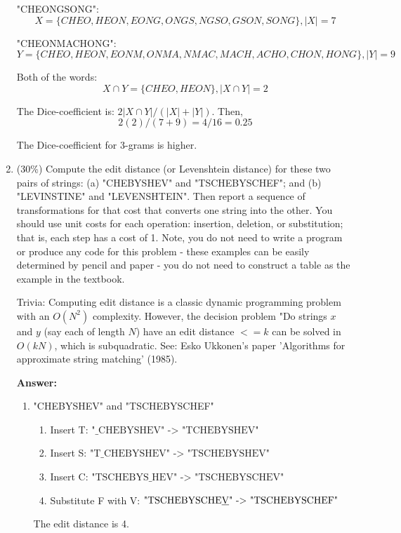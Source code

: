 \documentclass[11pt]{article}
\begin{document}
\begin{enumerate}
        "CHEONGSONG": \[ X = \{CHEO, HEON, EONG, ONGS, NGSO, GSON, SONG\}, |X| = 7 \]

        "CHEONMACHONG": \[ Y = \{CHEO, HEON, EONM, ONMA, NMAC, MACH, ACHO, CHON, HONG\}, |Y| = 9 \]

        Both of the words: \[ X \cap Y = \{CHEO, HEON\}, |X \cap Y| = 2 \]

        The Dice-coefficient is: $2|X \cap Y| / (|X|+|Y|)$. Then, \[ 2(2) / (7 + 9) = 4 / 16 = 0.25 \]

        The Dice-coefficient for 3-grams is higher.

        \item (30\%) Compute the edit distance (or Levenshtein distance) for these two pairs of strings: (a) "CHEBYSHEV" and "TSCHEBYSCHEF"; and (b) "LEVINSTINE" and "LEVENSHTEIN". Then report a sequence of transformations for that cost that converts one string into the other. You should use unit costs for each operation: insertion, deletion, or substitution; that is, each step has a cost of 1. Note, you do not need to write a program or produce any code for this problem - these examples can be easily determined by pencil and paper - you do not need to construct a table as the example in the textbook.

        Trivia: Computing edit distance is a classic dynamic programming problem with an $O(N^2)$ complexity. However, the decision problem "Do strings $x$ and $y$ (say each of length $N$) have an edit distance $<= k$ can be solved in $O(kN)$, which is subquadratic. See: Esko Ukkonen's paper 'Algorithms for approximate string matching' (1985).

        \textbf{Answer:}

        \begin{enumerate}
            \item "CHEBYSHEV" and "TSCHEBYSCHEF"
            \begin{enumerate}
                \item Insert T: $\text{"\_CHEBYSHEV" -> "TCHEBYSHEV"}$
                \item Insert S: $\text{"T\_CHEBYSHEV" -> "TSCHEBYSHEV"}$
                \item Insert C: $\text{"TSCHEBYS\_HEV" -> "TSCHEBYSCHEV"}$
                \item Substitute F with V: $\text{"TSCHEBYSCHE\underline{V}" -> "TSCHEBYSCHEF"}$
            \end{enumerate}
            The edit distance is 4.


\end{enumerate}
\end{enumerate}
\end{document}
